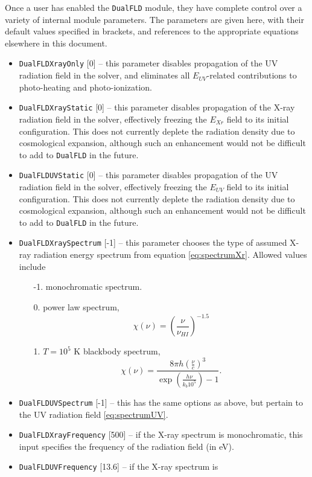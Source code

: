 \documentclass[letterpaper,10pt]{article}
\renewcommand{\(}{\left(}
\renewcommand{\)}{\right)}
\begin{document}
Once a user has enabled the {\tt DualFLD} module, they have
complete control over a variety of internal module parameters.  The
parameters are given here, with their default values specified in
brackets, and references to the appropriate equations elsewhere in
this document.
\begin{itemize}
\item {\tt DualFLDXrayOnly} [0] -- this parameter disables propagation
  of the UV radiation field in the solver, and eliminates all
  $E_{UV}$-related contributions to photo-heating and photo-ionization.
\item {\tt DualFLDXrayStatic} [0] -- this parameter disables
  propagation of the X-ray radiation field in the solver, effectively
  freezing the $E_{Xr}$ field to its initial configuration.  This does
  not currently deplete the radiation density due to cosmological
  expansion, although such an enhancement would not be difficult to
  add to {\tt DualFLD} in the future.
\item {\tt DualFLDUVStatic} [0] -- this parameter disables
  propagation of the UV radiation field in the solver, effectively
  freezing the $E_{UV}$ field to its initial configuration.  This does
  not currently deplete the radiation density due to cosmological
  expansion, although such an enhancement would not be difficult to
  add to {\tt DualFLD} in the future.
\item {\tt DualFLDXraySpectrum} [-1] -- this parameter chooses the type of
  assumed X-ray radiation energy spectrum from equation \eqref{eq:spectrumXr}.
  Allowed values include
  \begin{itemize}
  \item[-1.] monochromatic spectrum.
  \item[0.] power law spectrum,
    \[
      \chi(\nu) = \left(\frac{\nu}{\nu_{HI}}\right)^{-1.5}
    \]
  \item[1.] $T=10^5$ K blackbody spectrum, 
    \[
       \chi(\nu) = \frac{8 \pi h
         \left(\frac{\nu}{c}\right)^3}{\exp\left(\frac{h\nu}{k_b 10^5}\right)-1}.
    \]
  \end{itemize}
\item {\tt DualFLDUVSpectrum} [-1] -- this has the same options as
  above, but pertain to the UV radiation field \eqref{eq:spectrumUV}.
\item {\tt DualFLDXrayFrequency} [500] -- if the X-ray spectrum is
  monochromatic, this input specifies the frequency of the radiation
  field (in eV).
\item {\tt DualFLDUVFrequency} [13.6] -- if the X-ray spectrum is

\end{itemize}
\end{document}

